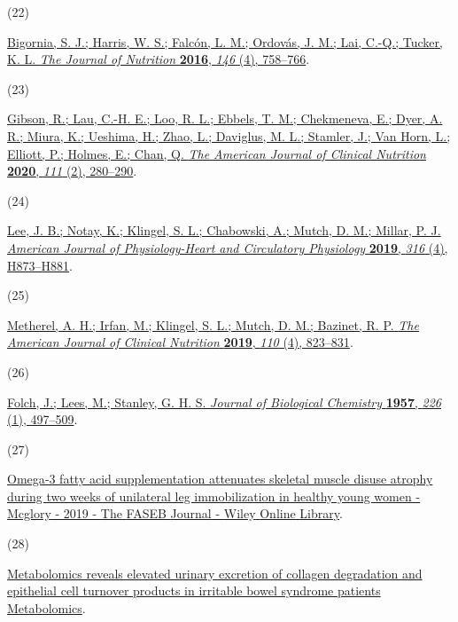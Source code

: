 \documentclass[journal=jacsat,manuscript=article]{achemso}
\newlength{\cslhangindent}
\newlength{\csllabelwidth}
\newenvironment{CSLReferences}[2] %
 {\begin{list}{}{%
  \setlength{\itemindent}{0pt}
  \setlength{\leftmargin}{0pt}
  \setlength{\parsep}{0pt}
  \ifodd #1
   \setlength{\leftmargin}{\cslhangindent}
   \setlength{\itemindent}{-1\cslhangindent}
  \fi
  \setlength{\itemsep}{#2\baselineskip}}}
 {\end{list}}
\newcommand{\CSLLeftMargin}[1]{\parbox[t]{\csllabelwidth}{#1}}
\newcommand{\CSLRightInline}[1]{\parbox[t]{\linewidth - \csllabelwidth}{#1}\break}
\begin{document}
\begin{CSLReferences}{0}{0}
\CSLLeftMargin{(22) }%
\CSLRightInline{\href{https://doi.org/10.3945/jn.115.222562}{Bigornia,
S. J.; Harris, W. S.; Falcón, L. M.; Ordovás, J. M.; Lai, C.-Q.; Tucker,
K. L. \emph{The Journal of Nutrition} \textbf{2016}, \emph{146} (4),
758--766}.}

\CSLLeftMargin{(23) }%
\CSLRightInline{\href{https://doi.org/10.1093/ajcn/nqz293}{Gibson, R.;
Lau, C.-H. E.; Loo, R. L.; Ebbels, T. M.; Chekmeneva, E.; Dyer, A. R.;
Miura, K.; Ueshima, H.; Zhao, L.; Daviglus, M. L.; Stamler, J.; Van
Horn, L.; Elliott, P.; Holmes, E.; Chan, Q. \emph{The American Journal
of Clinical Nutrition} \textbf{2020}, \emph{111} (2), 280--290}.}

\CSLLeftMargin{(24) }%
\CSLRightInline{\href{https://doi.org/10.1152/ajpheart.00677.2018}{Lee,
J. B.; Notay, K.; Klingel, S. L.; Chabowski, A.; Mutch, D. M.; Millar,
P. J. \emph{American Journal of Physiology-Heart and Circulatory
Physiology} \textbf{2019}, \emph{316} (4), H873--H881}.}

\CSLLeftMargin{(25) }%
\CSLRightInline{\href{https://doi.org/10.1093/ajcn/nqz097}{Metherel, A.
H.; Irfan, M.; Klingel, S. L.; Mutch, D. M.; Bazinet, R. P. \emph{The
American Journal of Clinical Nutrition} \textbf{2019}, \emph{110} (4),
823--831}.}

\CSLLeftMargin{(26) }%
\CSLRightInline{\href{https://doi.org/10.1016/S0021-9258(18)64849-5}{Folch,
J.; Lees, M.; Stanley, G. H. S. \emph{Journal of Biological Chemistry}
\textbf{1957}, \emph{226} (1), 497--509}.}

\CSLLeftMargin{(27) }%
\CSLRightInline{\href{https://faseb.onlinelibrary.wiley.com/doi/full/10.1096/fj.201801857RRR}{Omega‐3
fatty acid supplementation attenuates skeletal muscle disuse atrophy
during two weeks of unilateral leg immobilization in healthy young women
- {Mcglory} - 2019 - {The} {FASEB} {Journal} - {Wiley} {Online}
{Library}}.}

\CSLLeftMargin{(28) }%
\CSLRightInline{\href{https://link.springer.com/article/10.1007/s11306-019-1543-0}{Metabolomics
reveals elevated urinary excretion of collagen degradation and
epithelial cell turnover products in irritable bowel syndrome patients
{\textbar} {Metabolomics}}.}


\end{CSLReferences}
\end{document}
